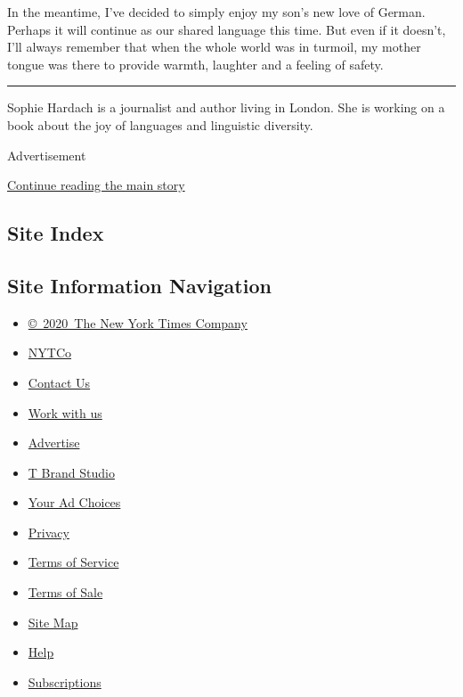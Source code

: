 In the meantime, I've decided to simply enjoy my son's new love of
German. Perhaps it will continue as our shared language this time. But
even if it doesn't, I'll always remember that when the whole world was
in turmoil, my mother tongue was there to provide warmth, laughter and a
feeling of safety.

\begin{center}\rule{0.5\linewidth}{\linethickness}\end{center}

Sophie Hardach is a journalist and author living in London. She is
working on a book about the joy of languages and linguistic diversity.

Advertisement

\protect\hyperlink{after-bottom}{Continue reading the main story}

\hypertarget{site-index}{%
\subsection{Site Index}\label{site-index}}

\hypertarget{site-information-navigation}{%
\subsection{Site Information
Navigation}\label{site-information-navigation}}

\begin{itemize}
\tightlist
\item
  \href{https://help.nytimes3xbfgragh.onion/hc/en-us/articles/115014792127-Copyright-notice}{©~2020~The
  New York Times Company}
\end{itemize}

\begin{itemize}
\tightlist
\item
  \href{https://www.nytco.com/}{NYTCo}
\item
  \href{https://help.nytimes3xbfgragh.onion/hc/en-us/articles/115015385887-Contact-Us}{Contact
  Us}
\item
  \href{https://www.nytco.com/careers/}{Work with us}
\item
  \href{https://nytmediakit.com/}{Advertise}
\item
  \href{http://www.tbrandstudio.com/}{T Brand Studio}
\item
  \href{https://www.nytimes3xbfgragh.onion/privacy/cookie-policy\#how-do-i-manage-trackers}{Your
  Ad Choices}
\item
  \href{https://www.nytimes3xbfgragh.onion/privacy}{Privacy}
\item
  \href{https://help.nytimes3xbfgragh.onion/hc/en-us/articles/115014893428-Terms-of-service}{Terms
  of Service}
\item
  \href{https://help.nytimes3xbfgragh.onion/hc/en-us/articles/115014893968-Terms-of-sale}{Terms
  of Sale}
\item
  \href{https://spiderbites.nytimes3xbfgragh.onion}{Site Map}
\item
  \href{https://help.nytimes3xbfgragh.onion/hc/en-us}{Help}
\item
  \href{https://www.nytimes3xbfgragh.onion/subscription?campaignId=37WXW}{Subscriptions}
\end{itemize}
